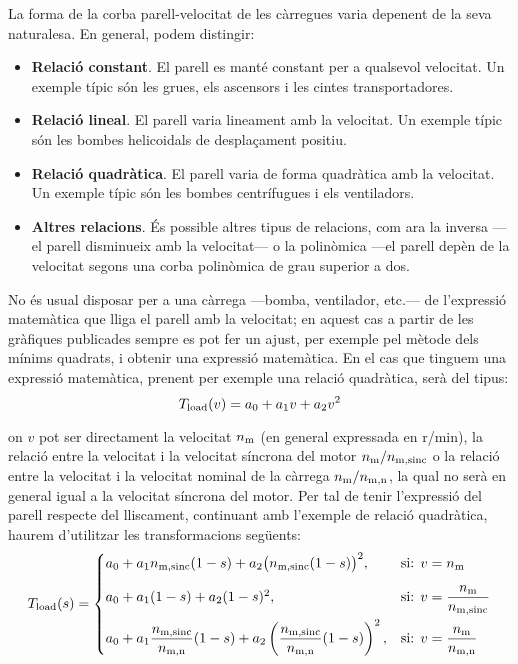 La forma de la corba parell-velocitat de les càrregues varia depenent de la seva naturalesa. En general, podem distingir:
\begin{itemize}
	\item  \textbf{Relació constant}. El parell es manté constant per a qualsevol velocitat. Un exemple típic són les grues, els ascensors i les cintes transportadores.
	
	\item  \textbf{Relació lineal}. El parell varia lineament amb la velocitat. Un exemple típic són les bombes helicoidals de desplaçament positiu.
	
	\item  \textbf{Relació quadràtica}. El parell varia de forma  quadràtica  amb la velocitat. Un exemple típic són les bombes centrífugues i els ventiladors.
	
	\item  \textbf{Altres relacions}. És possible altres tipus de relacions, com ara la inversa ---el parell disminueix amb la velocitat--- o la polinòmica ---el parell depèn de la velocitat segons una corba polinòmica de grau superior a dos.
\end{itemize}

No és  usual disposar per a una càrrega ---bomba, ventilador, etc.---   de l'expressió matemàtica que lliga el parell amb la velocitat; en aquest cas a partir de les gràfiques publicades sempre es pot fer un ajust, per exemple pel mètode dels mínims quadrats, i obtenir una expressió matemàtica. En el cas que tinguem una expressió matemàtica, prenent per exemple una relació quadràtica, serà del tipus:
\begin{equation}
	T_\mathrm{load}(v) = a_0 + a_1 v + a_2 v^2
\end{equation}

on $v$ pot ser directament la velocitat $n_\mathrm{m}$ (en general expressada en r/min),  la relació entre la velocitat i la velocitat síncrona del motor $n_\mathrm{m}/n_\mathrm{m,sinc}$ o la relació entre la velocitat i la velocitat nominal de la càrrega $n_\mathrm{m}/n_\mathrm{m,n}$, la qual no serà en general igual a la velocitat síncrona del motor. Per tal de tenir l'expressió del parell respecte del lliscament,  continuant amb l'exemple de relació quadràtica, haurem d'utilitzar les transformacions següents:
\begin{equation}\label{eq:Tload-v-s}
	T_\mathrm{load}(s) = \begin{cases}
		 a_0 + a_1 n_\mathrm{m,sinc}(1-s) + a_2 \big(n_\mathrm{m,sinc}(1-s)\big)^2,  & \text{si: } v=n_\mathrm{m}  \\[2ex]
		a_0 + a_1 (1-s) + a_2 (1-s)^2, &   
		\text{si: } v =\dfrac{n_\mathrm{m}}{n_\mathrm{m,sinc}} \\[2ex]
		 a_0 + a_1 \dfrac{n_\mathrm{m,sinc}}{n_\mathrm{m,n}}(1-s) + a_2 \left(\dfrac{n_\mathrm{m,sinc}}{n_\mathrm{m,n}}(1-s)\right)^2, &  \text{si: }  v = \dfrac{n_\mathrm{m}}{n_\mathrm{m,n}}
	\end{cases}
\end{equation}


